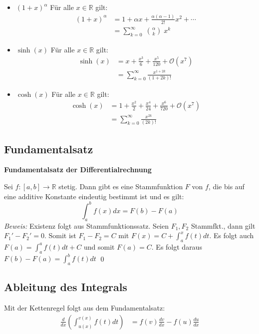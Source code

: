 \documentclass[25pt]{sciposter}
\newcommand{\R}{\mathbb{R}}
\newenvironment{method}[1]{\begin{mdframed}[backgroundcolor=blue!10,innertopmargin=15pt, innerbottommargin=15pt,nobreak=true]
		\textbf{#1 }
	}
	{ 
	\end{mdframed}
}
\begin{document}
\begin{multicols}{3}
\begin{itemize}
	\item $\boxed{(1 + x)^\alpha}$ Für alle $x\in \R$ gilt:
	\begin{align*}
	(1 + x)^\alpha &=  1 + \alpha x + \frac{\alpha(\alpha-1)}{2!} x^2 + \cdots \\
	 &= \sum_{k=0}^{\infty} \; {\alpha \choose k} \; x^k 
	\end{align*}
	
	\item $\boxed{\sinh(x)}$ Für alle $x\in \R$ gilt:
	\begin{align*}
	\sinh(x) &= x + \frac{x^3}{6} + \frac{x^5}{120} + \mathcal{O}(x^7)\\
	&= \sum_{k=0}^{\infty}\frac{x^{1+2k}}{(1+2k)!}
	\end{align*}
	
	\item $\boxed{\cosh(x)}$ Für alle $x\in \R$ gilt:
	\begin{align*}
	\cosh(x) &= 1 + \frac{x^2}{2} + \frac{x^4}{24} + \frac{x^6}{720} +  \mathcal{O}(x^7)\\
	&= \sum_{k=0}^{\infty}\frac{x^{2k}}{(2k)!}
	\end{align*}
	

\end{itemize}






\subsection*{Fundamentalsatz}

\begin{method}{Fundamentalsatz der Differentialrechnung}
Sei $f:[a,b] \to \R$ stetig. Dann gibt es eine Stammfunktion $F$ von $f$, die bis auf eine additive Konstante eindeutig bestimmt ist und es gilt:
$$\int_{a}^{b} f(x) dx = F(b) - F(a)$$
\textit{Beweis:} Existenz folgt aus Stammfunktionssatz. Seien $F_1, F_2$ Stammfkt., dann gilt $F_1' - F_2' = 0$. Somit ist $F_1 - F_2 = C$ mit $F(x) = C + \int_{a}^{x} f(t) dt$. Es folgt auch $F(a) = \int_{a}^{a} f(t) dt + C$ und somit $F(a) = C$. Es folgt daraus $F(b)-F(a) = \int_{a}^{b} f(t) dt$ \qed 
\end{method}


\subsection*{Ableitung des Integrals}
Mit der Kettenregel folgt aus dem Fundamentalsatz:
\begin{align*}
\frac{d}{dx} \left( \int_{u(x)}^{v(x)} f(t)  dt \right) &= f(v)\frac{dv}{dx} - f(u)\frac{du}{dx}
\end{align*}


\end{multicols}
\end{document}
